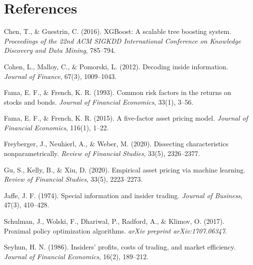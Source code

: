 \documentclass{article}
\begin{document}
\section{References}
\small

\begin{list}{}{\setlength{\leftmargin}{0.25in}
               \setlength{\itemindent}{-0.25in}
               \setlength{\itemsep}{0.5em}}

\item Chen, T., \& Guestrin, C. (2016). XGBoost: A scalable tree boosting system. \textit{Proceedings of the 22nd ACM SIGKDD International Conference on Knowledge Discovery and Data Mining}, 785--794.

\item Cohen, L., Malloy, C., \& Pomorski, L. (2012). Decoding inside information. \textit{Journal of Finance}, 67(3), 1009--1043.

\item Fama, E. F., \& French, K. R. (1993). Common risk factors in the returns on stocks and bonds. \textit{Journal of Financial Economics}, 33(1), 3--56.

\item Fama, E. F., \& French, K. R. (2015). A five-factor asset pricing model. \textit{Journal of Financial Economics}, 116(1), 1--22.

\item Freyberger, J., Neuhierl, A., \& Weber, M. (2020). Dissecting characteristics nonparametrically. \textit{Review of Financial Studies}, 33(5), 2326--2377.

\item Gu, S., Kelly, B., \& Xiu, D. (2020). Empirical asset pricing via machine learning. \textit{Review of Financial Studies}, 33(5), 2223--2273.

\item Jaffe, J. F. (1974). Special information and insider trading. \textit{Journal of Business}, 47(3), 410--428.

\item Schulman, J., Wolski, F., Dhariwal, P., Radford, A., \& Klimov, O. (2017). Proximal policy optimization algorithms. \textit{arXiv preprint arXiv:1707.06347}.

\item Seyhun, H. N. (1986). Insiders' profits, costs of trading, and market efficiency. \textit{Journal of Financial Economics}, 16(2), 189--212.

\end{list}
\end{document}
